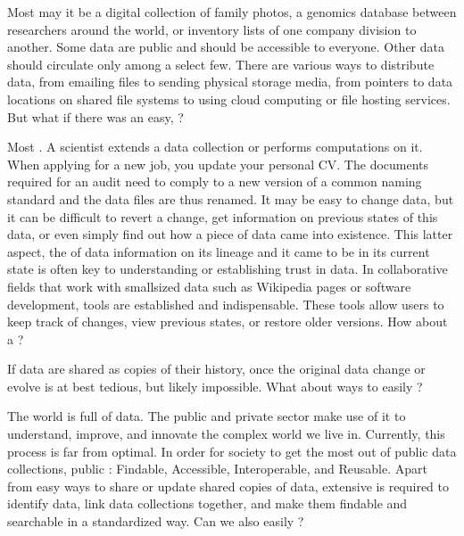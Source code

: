 \sphinxAtStartPar
Most  \textendash{} may it be a digital collection of family
photos, a genomics database between researchers around the world, or inventory
lists of one company division to another. Some data are public and should be
accessible to everyone.  Other data should circulate only among a select few.
There are various ways to distribute data, from emailing files to sending
physical storage media, from pointers to data locations on shared file systems
to using cloud computing or file hosting services. But what if there was an
easy, ?

\sphinxAtStartPar
Most . A scientist extends a data collection or
performs computations on it. When applying for a new job, you update your
personal CV.  The documents required for an audit need to comply to a new
version of a common naming standard and the data files are thus renamed.  It may
be easy to change data, but it can be difficult to revert a change, get
information on previous states of this data, or even simply find out how a piece
of data came into existence. This latter aspect, the {\hyperref[\detokenize{glossary:term-provenance}]{}} of data
\textendash{} information on its lineage and  it came to be in its current state \textendash{} is
often key to understanding or establishing trust in data.  In collaborative
fields that work with small\sphinxhyphen{}sized data such as Wikipedia pages or software
development, {\hyperref[\detokenize{glossary:term-version-control}]{}} tools are established and indispensable. These
tools allow users to keep track of changes, view previous states, or restore
older versions.  How about a ?

\sphinxAtStartPar
If data are shared as copies  of their history,  once the original data change or evolve is at
best tedious, but likely impossible. What about ways to easily ?

\sphinxAtStartPar
The world is full of data. The public and private sector make use of it to
understand, improve, and innovate the complex world we live in.  Currently, this
process is far from optimal.  In order for society to get the most out of public
data collections, public  : Findable,
Accessible, Interoperable, and Reusable. Apart from easy ways to share or update
shared copies of data, extensive  is required to identify data, link
data collections together, and make them findable and searchable in a
standardized way. Can we also easily ?


